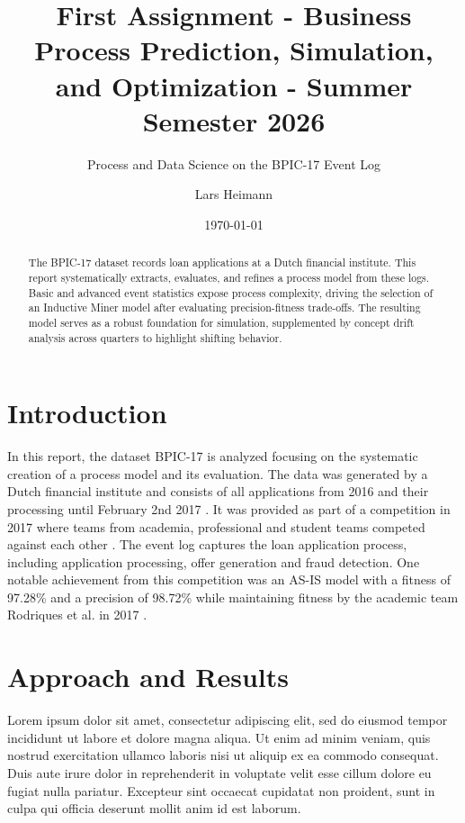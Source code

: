 \documentclass[
  english,        %
  font=times,     %
  twocolumn,      %
]{tumarticle}
\title{First Assignment - Business Process Prediction, Simulation, and Optimization - Summer Semester 2026}
\subtitle{Process and Data Science on the BPIC-17 Event Log}
\author[email=lars.heimann@tum.de]{Lars Heimann}
\date\today
\begin{document}
\maketitle

\begin{abstract}
The BPIC-17 dataset records loan applications at a Dutch financial institute. This report systematically extracts, evaluates, and refines a process model from these logs. Basic and advanced event statistics expose process complexity, driving the selection of an Inductive Miner model after evaluating precision-fitness trade-offs. The resulting model serves as a robust foundation for simulation, supplemented by concept drift analysis across quarters to highlight shifting behavior.
\end{abstract}
%

\section{Introduction}
In this report, the dataset BPIC-17 \cite{BPI_data} is analyzed focusing on the systematic creation of a process model and its evaluation. The data was generated by a Dutch financial institute and consists of all applications from 2016 and their processing until February 2nd 2017 \cite{BPIC_2017challenge}. It was provided as part of a competition in 2017 where teams from academia, professional and student teams competed against each other \cite{BPIC_2017challenge}. The event log captures the loan application process, including application processing, offer generation and fraud detection. One notable achievement from this competition was an AS-IS model with a fitness of 97.28\% and a precision of 98.72\% while maintaining fitness by the academic team Rodriques et al. in 2017 \cite{rodrigues2017academics}.

\section{Approach and Results}
Lorem ipsum dolor sit amet, consectetur adipiscing elit, sed do eiusmod tempor 
incididunt ut labore et dolore magna aliqua. Ut enim ad minim veniam, quis 
nostrud exercitation ullamco laboris nisi ut aliquip ex ea commodo consequat. 
Duis aute irure dolor in reprehenderit in voluptate velit esse cillum dolore 
eu fugiat nulla pariatur. Excepteur sint occaecat cupidatat non proident, sunt 
in culpa qui officia deserunt mollit anim id est laborum.
\end{document}
